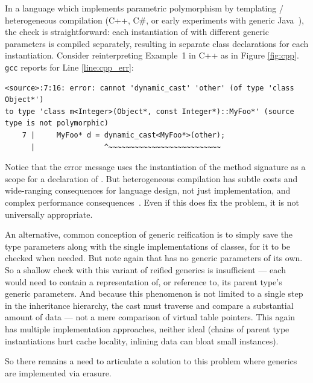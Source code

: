 In a language which implements parametric polymorphism by templating / heterogeneous compilation
(C++, C\#, or early experiments with generic Java~\cite{agesen1997adding}), the check is straightforward:
each instantiation of \Q@m@ with different generic parameters is compiled separately, resulting in separate
class declarations for each instantiation.
Consider reinterpreting Example~1 in C++ as in Figure \ref{fig:cpp}.
\texttt{gcc} reports for Line \ref{line:cpp_err}:
\begin{verbatim}
<source>:7:16: error: cannot 'dynamic_cast' 'other' (of type 'class Object*')
to type 'class m<Integer>(Object*, const Integer*)::MyFoo*' (source type is not polymorphic)
    7 |     MyFoo* d = dynamic_cast<MyFoo*>(other);
      |                ^~~~~~~~~~~~~~~~~~~~~~~~~~~
\end{verbatim}
Notice that the error message uses the instantiation of the method signature as a scope for a declaration of \Q@MyFoo@.
But heterogeneous compilation has subtle costs and wide-ranging consequences for language design, not just implementation,
and complex performance consequences~\cite{odersky2001two,kennedy2001design}. Even if this does fix the problem,
it is not universally appropriate.

An alternative, common conception of generic reification is to simply save the type parameters along with the
single implementations of classes, for it to be checked when needed. But note again that \Q@MyFoo@
has no generic parameters of its own. So a shallow check with this variant of reified generics is insufficient ---
each \Q@MyFoo@ would need to contain a representation of, or reference to, its parent type's generic parameters.
And because this phenomenon is not limited to a single step in the inheritance hierarchy, the cast must traverse and compare
a substantial amount of data --- not a mere comparison of virtual table pointers. This again has multiple implementation
approaches, neither ideal (chains of parent type instantiations hurt cache locality, inlining data can bloat small instances).

So there remains a need to articulate a solution to this problem where generics are implemented via erasure.



